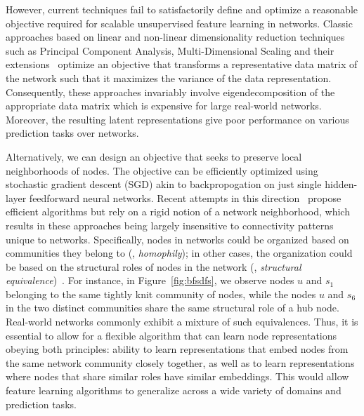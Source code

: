 However, current techniques fail to satisfactorily define and optimize a reasonable objective required for scalable unsupervised feature learning in networks. Classic approaches based on linear and non-linear dimensionality reduction techniques such as Principal Component Analysis, Multi-Dimensional Scaling and their extensions~\cite{belkin-nips2001, roweis-science2000, tenenbaum-science2000, yan2007graph} optimize an objective that transforms a representative data matrix of the network such that it maximizes the variance of the data representation. Consequently, these approaches invariably involve eigendecomposition of the appropriate data matrix which is expensive for large real-world networks. Moreover, the resulting latent representations give %
poor performance on various prediction tasks over networks. 

Alternatively, we can design an objective that seeks to preserve local neighborhoods of nodes. The objective can be efficiently optimized using stochastic gradient descent (SGD) akin to backpropogation on just single hidden-layer feedforward neural networks.
Recent attempts in this direction~\cite{deepwalk, line} propose 
efficient algorithms but %
rely on a rigid notion of a network neighborhood, which results in these approaches
being largely insensitive to connectivity patterns unique to networks.
%
Specifically, nodes in networks could be organized based on communities they belong to (\ie, \emph{homophily}); in other cases, the organization could be based on the structural roles of nodes in the network (\ie, \emph{structural equivalence})~\cite{fortunato09community,henderson-kdd2012, yang14ieee}. 
For instance, in Figure~\ref{fig:bfsdfs}, we observe nodes $u$ and $s_1$ belonging to the same tightly knit community of nodes, while the nodes $u$ and $s_6$ in the two distinct communities share the same structural role of a hub node. Real-world networks commonly exhibit a mixture of such equivalences. Thus, it is essential to allow for a flexible algorithm that can learn node representations obeying both principles: ability to learn representations that embed nodes from the same network community closely together, as well as to learn representations where nodes 
that share similar roles have similar embeddings. This would allow feature learning algorithms to generalize across a wide variety of domains and prediction tasks.

